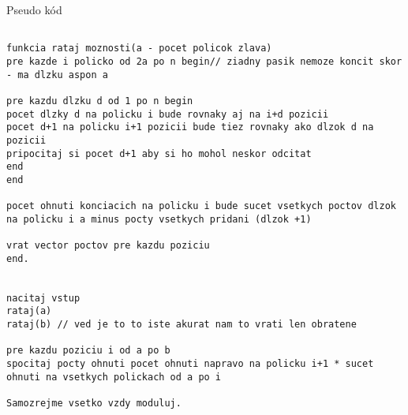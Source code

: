 \documentclass[a4paper,11pt]{article}
\begin{document}
Pseudo kód

\begin{lstlisting}

funkcia rataj moznosti(a - pocet policok zlava)
pre kazde i policko od 2a po n begin// ziadny pasik nemoze koncit skor 
- ma dlzku aspon a

pre kazdu dlzku d od 1 po n begin
pocet dlzky d na policku i bude rovnaky aj na i+d pozicii
pocet d+1 na policku i+1 pozicii bude tiez rovnaky ako dlzok d na pozicii
pripocitaj si pocet d+1 aby si ho mohol neskor odcitat
end
end

pocet ohnuti konciacich na policku i bude sucet vsetkych poctov dlzok na policku i a minus pocty vsetkych pridani (dlzok +1)

vrat vector poctov pre kazdu poziciu
end.


nacitaj vstup
rataj(a)
rataj(b) // ved je to to iste akurat nam to vrati len obratene

pre kazdu poziciu i od a po b
spocitaj pocty ohnuti pocet ohnuti napravo na policku i+1 * sucet ohnuti na vsetkych polickach od a po i	

Samozrejme vsetko vzdy moduluj.	

\end{lstlisting}
\end{document}
